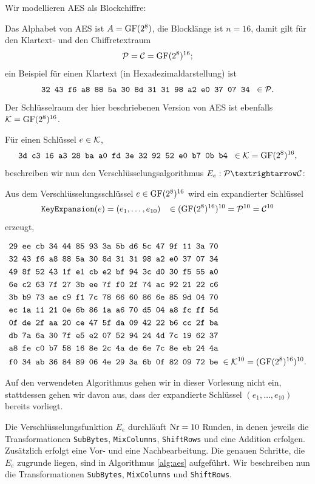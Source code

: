 Wir modellieren AES als Blockchiffre:

Das Alphabet von AES ist $A = \operatorname{GF}(2^8)$, die Blocklänge ist $n = 16$, damit gilt für den Klartext- und den Chiffretextraum 
\[\mathcal P = \mathcal C = \operatorname{GF}(2^8)^{16};\]
ein Beispiel für einen Klartext (in Hexadezimaldarstellung) ist
\[\texttt{32 43 f6 a8 88 5a 30 8d 31 31 98 a2 e0 37 07 34} \; \; \in \mathcal P.\]
Der Schlüsselraum der hier beschriebenen Version von AES ist ebenfalls $\mathcal K = \operatorname{GF}(2^8)^{16}$.
 
Für einen Schlüssel $e \in \mathcal K$, \zB
\[\texttt{3d c3 16 a3 28 ba a0 fd 3e 32 92 52 e0 b7 0b b4} \; \; \in \mathcal K = \operatorname{GF}(2^8)^{16},\]
beschreiben wir nun den Verschlüsselungsalgorithmus $E_e: \mc P → \mc C$:

Aus dem Verschlüsselungsschlüssel $e \in \operatorname{GF}(2^8)^{16}$ wird ein expandierter Schlüssel 
\[\texttt{KeyExpansion}(e) = (e_1, \dots, e_{10}) \;\;\; \in (\operatorname{GF}(2^8)^{16})^{10} = \mathcal P^{10} = \mathcal C^{10}\]
erzeugt, \zB
\begin{center}
\begin{align*}
\texttt{29 ee cb 34 44 85 93 3a 5b d6 5c 47 9f 11 3a 70} & \\  
\texttt{32 43 f6 a8 88 5a 30 8d 31 31 98 a2 e0 37 07 34} & \\
\texttt{49 8f 52 43 1f e1 cb e2 bf 94 3c d0 30 f5 55 a0} & \\
\texttt{6e c2 63 7f 27 3b ee 7f f0 2f 74 ac 92 21 22 c6} & \\
\texttt{3b b9 73 ae c9 f1 7c 78 66 60 86 6e 85 9d 04 70} & \\
\texttt{ec 1a 11 21 0e 6b 86 1a a6 70 d5 04 a8 fc ff 5d} & \\
\texttt{0f de 2f aa 20 ce 47 5f da 09 42 22 b6 cc 2f ba} & \\
\texttt{db 7a 6a 30 7f e5 e2 07 52 94 24 4d 7c 19 62 37} & \\
\texttt{a8 fe c0 b7 58 16 8e 2c 4a de 6e 7c 8e eb 24 4a} & \\
\texttt{f0 34 ab 36 84 89 06 4e 29 3a 6b 0f 82 09 72 be} & \; \in \mathcal K^{10} = (\operatorname{GF}(2^8)^{16})^{10}.
 \end{align*}
 \end{center}
 Auf den verwendeten Algorithmus gehen wir in dieser Vorlesung nicht ein, stattdessen gehen wir davon aus, dass der expandierte Schlüssel $(e_1, \dots, e_{10})$ bereits vorliegt.

Die Verschlüsselungsfunktion $E_e$ durchläuft $\operatorname {Nr} = 10$ Runden, in denen jeweils die Transformationen \texttt{SubBytes}, \texttt{MixColumns}, \texttt{ShiftRows} und eine Addition erfolgen. Zusätzlich erfolgt eine Vor- und eine Nachbearbeitung. Die genauen Schritte, die $E_e$ zugrunde liegen, sind in Algorithmus \ref{alg:aes} aufgeführt. Wir beschreiben nun die Transformationen \texttt{SubBytes}, \texttt{MixColumns} und \texttt{ShiftRows}. 

